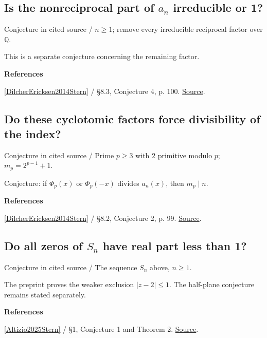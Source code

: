 \documentclass[11pt,a4paper,oneside,openany]{book}
\newenvironment{sources}{\par\smallskip\begingroup\footnotesize\color{atlasgray}\leftskip=10pt\setlength{\parskip}{2pt}}{\par\endgroup\smallskip}
\begin{document}
\subsection*{Is the nonreciprocal part of \(a_n\) irreducible or 1?}
{\small\sffamily\color{atlasgold}Conjecture in cited source / \(n\ge1\); remove every irreducible reciprocal factor over \(\mathbb Q\).}\par\smallskip
\color{black} This is a separate conjecture concerning the remaining factor.\par
\begin{sources}
\textbf{References}\par\smallskip
\noindent\hyperlink{ref:DilcherEricksen2014Stern}{[DilcherEricksen2014Stern]} / §8.3, Conjecture 4, p. 100.  \href{https://dml.cz/handle/10338.dmlcz/143908}{Source}.\par
\end{sources}\color{black}
\subsection*{Do these cyclotomic factors force divisibility of the index?}
{\small\sffamily\color{atlasgold}Conjecture in cited source / Prime \(p\ge3\) with 2 primitive modulo \(p\); \(m_p=2^{p-1}+1\).}\par\smallskip
\color{black} Conjecture: if \(\Phi_p(x)\) or \(\Phi_p(-x)\) divides \(a_n(x)\), then \(m_p\mid n\).\par
\begin{sources}
\textbf{References}\par\smallskip
\noindent\hyperlink{ref:DilcherEricksen2014Stern}{[DilcherEricksen2014Stern]} / §8.2, Conjecture 2, p. 99.  \href{https://dml.cz/handle/10338.dmlcz/143908}{Source}.\par
\end{sources}\color{black}
\subsection*{Do all zeros of \(S_n\) have real part less than 1?}
{\small\sffamily\color{atlasgold}Conjecture in cited source / The sequence \(S_n\) above, \(n\ge1\).}\par\smallskip
\color{black} The preprint proves the weaker exclusion \(|z-2|\le1\). The half-plane conjecture remains stated separately.\par
\begin{sources}
\textbf{References}\par\smallskip
\noindent\hyperlink{ref:Altizio2025Stern}{[Altizio2025Stern]} / §1, Conjecture 1 and Theorem 2.  \href{https://arxiv.org/abs/2511.03847}{Source}.\par
\end{sources}\color{black}
\end{document}
